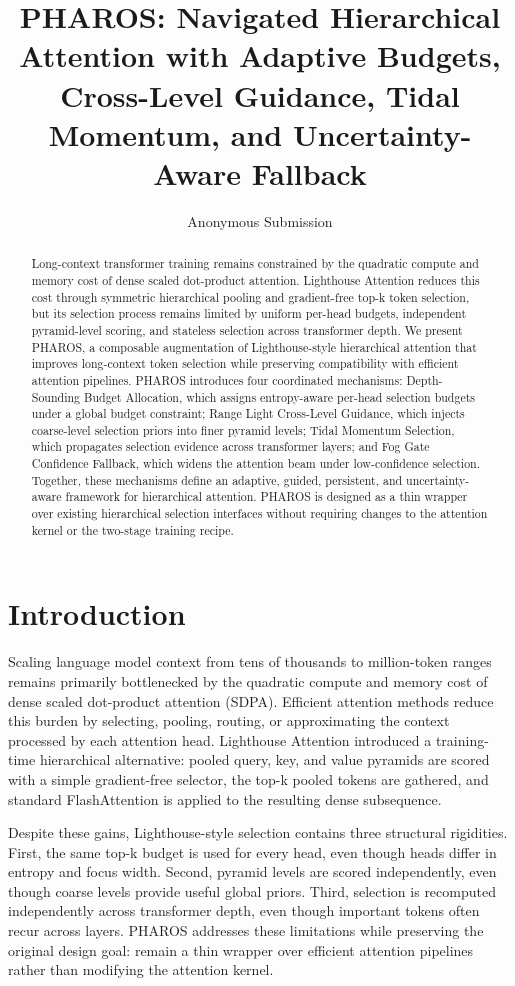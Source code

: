 \documentclass[letterpaper]{article}
\title{PHAROS: Navigated Hierarchical Attention with Adaptive Budgets, Cross-Level Guidance, Tidal Momentum, and Uncertainty-Aware Fallback}
\author{Anonymous Submission}
\begin{document}
\maketitle

\begin{abstract}
Long-context transformer training remains constrained by the quadratic compute and memory cost of dense scaled dot-product attention. Lighthouse Attention reduces this cost through symmetric hierarchical pooling and gradient-free top-k token selection, but its selection process remains limited by uniform per-head budgets, independent pyramid-level scoring, and stateless selection across transformer depth. We present PHAROS, a composable augmentation of Lighthouse-style hierarchical attention that improves long-context token selection while preserving compatibility with efficient attention pipelines. PHAROS introduces four coordinated mechanisms: Depth-Sounding Budget Allocation, which assigns entropy-aware per-head selection budgets under a global budget constraint; Range Light Cross-Level Guidance, which injects coarse-level selection priors into finer pyramid levels; Tidal Momentum Selection, which propagates selection evidence across transformer layers; and Fog Gate Confidence Fallback, which widens the attention beam under low-confidence selection. Together, these mechanisms define an adaptive, guided, persistent, and uncertainty-aware framework for hierarchical attention. PHAROS is designed as a thin wrapper over existing hierarchical selection interfaces without requiring changes to the attention kernel or the two-stage training recipe.
\end{abstract}

\section{Introduction}
Scaling language model context from tens of thousands to million-token ranges remains primarily bottlenecked by the quadratic compute and memory cost of dense scaled dot-product attention (SDPA). Efficient attention methods reduce this burden by selecting, pooling, routing, or approximating the context processed by each attention head. Lighthouse Attention introduced a training-time hierarchical alternative: pooled query, key, and value pyramids are scored with a simple gradient-free selector, the top-k pooled tokens are gathered, and standard FlashAttention is applied to the resulting dense subsequence.

Despite these gains, Lighthouse-style selection contains three structural rigidities. First, the same top-k budget is used for every head, even though heads differ in entropy and focus width. Second, pyramid levels are scored independently, even though coarse levels provide useful global priors. Third, selection is recomputed independently across transformer depth, even though important tokens often recur across layers. PHAROS addresses these limitations while preserving the original design goal: remain a thin wrapper over efficient attention pipelines rather than modifying the attention kernel.
\end{document}
